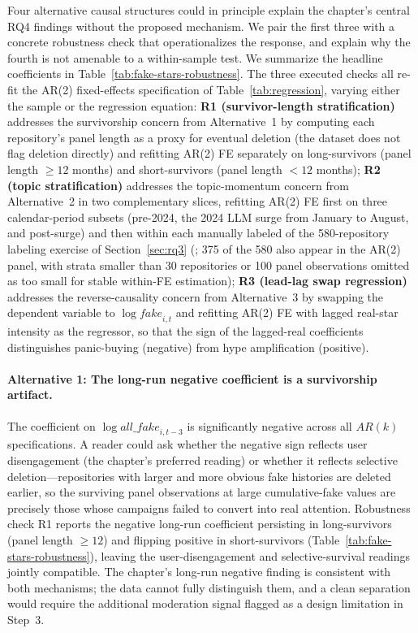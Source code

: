 Four alternative causal structures could in principle explain the chapter's central RQ4 findings without the proposed mechanism.
We pair the first three with a concrete robustness check that operationalizes the response, and explain why the fourth is not amenable to a within-sample test.
We summarize the headline coefficients in Table~\ref{tab:fake-stars-robustness}. %
The three executed checks all re-fit the AR(2) fixed-effects specification of Table~\ref{tab:regression}, varying either the sample or the regression equation:
\textbf{R1 (survivor-length stratification)} addresses the survivorship concern from Alternative~1 by computing each repository's panel length as a proxy for eventual deletion (the dataset does not flag deletion directly) and refitting AR(2) FE separately on long-survivors (panel length $\geq 12$ months) and short-survivors (panel length $< 12$ months);
\textbf{R2 (topic stratification)} addresses the topic-momentum concern from Alternative~2 in two complementary slices, refitting AR(2) FE first on three calendar-period subsets (pre-2024, the 2024 LLM surge from January to August, and post-surge) and then within each manually labeled  of the 580-repository labeling exercise of Section~\ref{sec:rq3} (; 375 of the 580 also appear in the AR(2) panel, with strata smaller than 30 repositories or 100 panel observations omitted as too small for stable within-FE estimation);
\textbf{R3 (lead-lag swap regression)} addresses the reverse-causality concern from Alternative~3 by swapping the dependent variable to $\log \textit{fake}_{i,t}$ and refitting AR(2) FE with lagged real-star intensity as the regressor, so that the sign of the lagged-real coefficients distinguishes panic-buying (negative) from hype amplification (positive).

\paragraph{Alternative 1: The long-run negative coefficient is a survivorship artifact.}
The coefficient on $\log \textit{all\_fake}_{i, t-3}$ is significantly negative across all $AR(k)$ specifications.
A reader could ask whether the negative sign reflects user disengagement (the chapter's preferred reading) or whether it reflects selective deletion---repositories with larger and more obvious fake histories are deleted earlier, so the surviving panel observations at large cumulative-fake values are precisely those whose campaigns failed to convert into real attention.
Robustness check R1 reports the negative long-run coefficient persisting in long-survivors (panel length $\geq 12$) and flipping positive in short-survivors (Table~\ref{tab:fake-stars-robustness}), leaving the user-disengagement and selective-survival readings jointly compatible.
The chapter's long-run negative finding is consistent with both mechanisms; the data cannot fully distinguish them, and a clean separation would require the additional moderation signal flagged as a design limitation in Step~3.

